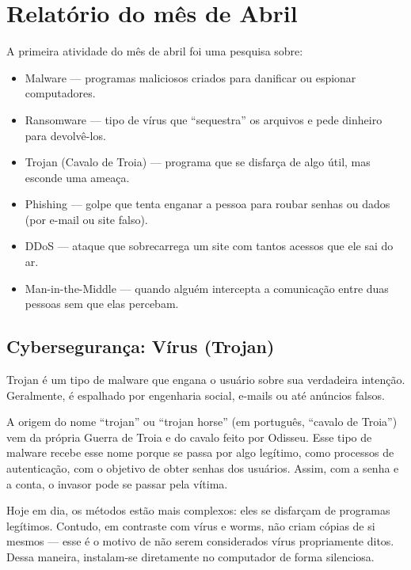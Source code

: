 


	
	\section{Relatório do mês de Abril}
	
	A primeira atividade do mês de abril foi uma pesquisa sobre:
	\begin{itemize}
		\item Malware --- programas maliciosos criados para danificar ou espionar computadores.
		\item Ransomware --- tipo de vírus que ``sequestra'' os arquivos e pede dinheiro para devolvê-los.
		\item Trojan (Cavalo de Troia) --- programa que se disfarça de algo útil, mas esconde uma ameaça.
		\item Phishing --- golpe que tenta enganar a pessoa para roubar senhas ou dados (por e-mail ou site falso).
		\item DDoS --- ataque que sobrecarrega um site com tantos acessos que ele sai do ar.
		\item Man-in-the-Middle --- quando alguém intercepta a comunicação entre duas pessoas sem que elas percebam.
	\end{itemize}
	
	\subsection*{Cybersegurança: Vírus (Trojan)}
	
	Trojan é um tipo de malware que engana o usuário sobre sua verdadeira intenção. Geralmente, é espalhado por engenharia social, e-mails ou até anúncios falsos.
	
	A origem do nome ``trojan'' ou ``trojan horse'' (em português, ``cavalo de Troia'') vem da própria Guerra de Troia e do cavalo feito por Odisseu. Esse tipo de malware recebe esse nome porque se passa por algo legítimo, como processos de autenticação, com o objetivo de obter senhas dos usuários. Assim, com a senha e a conta, o invasor pode se passar pela vítima.
	
	Hoje em dia, os métodos estão mais complexos: eles se disfarçam de programas legítimos. Contudo, em contraste com vírus e worms, não criam cópias de si mesmos --- esse é o motivo de não serem considerados vírus propriamente ditos. Dessa maneira, instalam-se diretamente no computador de forma silenciosa.
	
